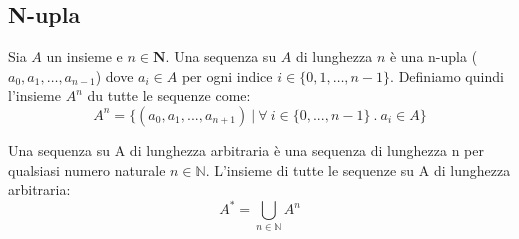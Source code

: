 \subsection{N-upla}
\begin{definition}[N-upla]
Sia $A$ un insieme e $n \in \mathbf{N}$. Una sequenza su $A$ di lunghezza $n$ è una n-upla ($a_0, a_1, \ldots, a_{n-1}$) dove $a_i \in A$ per ogni indice $i \in \{0,1,\ldots,n-1\}$. Definiamo quindi l'insieme $A^n$ du tutte le sequenze come:
\begin{equation}
    A^n = \{(a_0,a_1, ..., a_{n+1}) \:|\: \forall \: i \in \{0,...,n-1\}\:.\: a_i \in A\}
\end{equation}
\end{definition}

\begin{definition}
Una sequenza su A di lunghezza arbitraria è una sequenza di lunghezza n per qualsiasi numero naturale $n \in \mathbb{N}$. L'insieme di tutte le sequenze su A di lunghezza arbitraria:
\[A^* = \bigcup_{n\in \mathbb{N}} A^n\]
\end{definition}